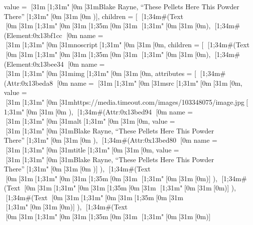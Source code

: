 {{{{{{{{{                                  value = [31m[1;31m"[0m[31mBlake Rayne, “These Pellets Here This Powder There”[1;31m"[0m[31m[0m
                                  })],
                              children = [
                                [1;34m#(Text [0m[31m[1;31m"[0m[31m[1;35m\n[0m[31m            [1;31m"[0m[31m[0m),
                                [1;34m#(Element:0x13bf1cc {[0m
                                  name = [31m[1;31m"[0m[31mnoscript[1;31m"[0m[31m[0m,
                                  children = [
                                    [1;34m#(Text [0m[31m[1;31m"[0m[31m[1;35m\n[0m[31m                [1;31m"[0m[31m[0m),
                                    [1;34m#(Element:0x13bee34 {[0m
                                      name = [31m[1;31m"[0m[31mimg[1;31m"[0m[31m[0m,
                                      attributes = [
                                        [1;34m#(Attr:0x13beda8 {[0m
                                          name = [31m[1;31m"[0m[31msrc[1;31m"[0m[31m[0m,
                                          value = [31m[1;31m"[0m[31mhttps://media.timeout.com/images/103348075/image.jpg[1;31m"[0m[31m[0m
                                          }),
                                        [1;34m#(Attr:0x13bed94 {[0m
                                          name = [31m[1;31m"[0m[31malt[1;31m"[0m[31m[0m,
                                          value = [31m[1;31m"[0m[31mBlake Rayne, “These Pellets Here This Powder There”[1;31m"[0m[31m[0m
                                          }),
                                        [1;34m#(Attr:0x13bed80 {[0m
                                          name = [31m[1;31m"[0m[31mtitle[1;31m"[0m[31m[0m,
                                          value = [31m[1;31m"[0m[31mBlake Rayne, “These Pellets Here This Powder There”[1;31m"[0m[31m[0m
                                          })]
                                      }),
                                    [1;34m#(Text [0m[31m[1;31m"[0m[31m[1;35m\n[0m[31m            [1;31m"[0m[31m[0m)]
                                  }),
                                [1;34m#(Text [0m[31m[1;31m"[0m[31m[1;35m\n[0m[31m        [1;31m"[0m[31m[0m)]
                              }),
                            [1;34m#(Text [0m[31m[1;31m"[0m[31m[1;35m\n[0m[31m    [1;31m"[0m[31m[0m)]
                          }),
                        [1;34m#(Text [0m[31m[1;31m"[0m[31m[1;35m\n[0m[31m                    [1;31m"[0m[31m[0m)]
}}}}}}
